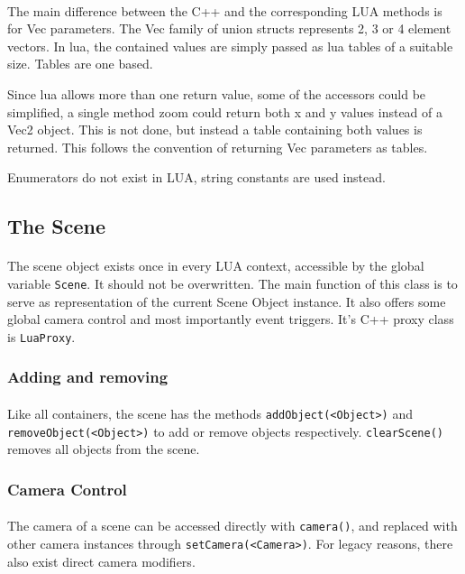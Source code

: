 \paragraph{}
The main difference between the C++ and the corresponding LUA methods is for Vec parameters.
The Vec family of union structs represents 2, 3 or 4 element vectors.
In lua, the contained values are simply passed as lua tables of a suitable size.
Tables are one based.

Since lua allows more than one return value, some of the accessors could be simplified, a single method zoom could return both x and y values instead of a Vec2 object.
This is not done, but instead a table containing both values is returned.
This follows the convention of returning Vec parameters as tables.

Enumerators do not exist in LUA, string constants are used instead.

\subsection{The Scene}
\paragraph{}
The scene object exists once in every LUA context, accessible by the global variable \texttt{Scene}. It should not be overwritten.
The main function of this class is to serve as representation of the current Scene Object instance.
It also offers some global camera control and most importantly event triggers.
It's C++ proxy class is \texttt{LuaProxy}.

\subsubsection{Adding and removing}
\paragraph{}
Like all containers, the scene has the methods \texttt{addObject(<Object>)} and \texttt{removeObject(<Object>)} to add or remove objects respectively.
\texttt{clearScene()} removes all objects from the scene.

\subsubsection{Camera Control}
\paragraph{}
The camera of a scene can be accessed directly with \texttt{camera()}, and replaced with other camera instances through \texttt{setCamera(<Camera>)}.
For legacy reasons, there also exist direct camera modifiers.

